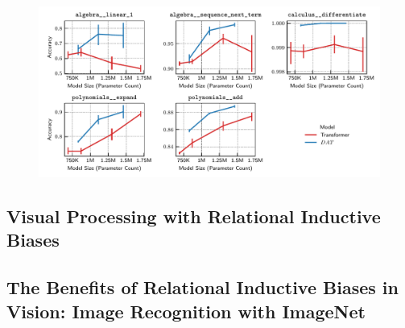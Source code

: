 
\begin{figure}
    \includegraphics[width=\textwidth]{figs/experiments/math/math_accuracy_scaling.pdf}
    \caption{}\label{fig:math_scaling}
\end{figure}

%     




\subsection{Visual Processing with Relational Inductive Biases}\label{ssec:vision}

\subsection{The Benefits of Relational Inductive Biases in Vision: Image Recognition with ImageNet}\label{ssec:imagenet}

